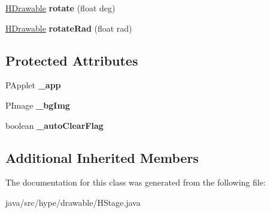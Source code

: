 \begin{DoxyCompactItemize}
\item 
\hypertarget{classhype_1_1drawable_1_1_h_stage_a9f9b1b42692ba75442c3c77a02ae54bf}{\hyperlink{classhype_1_1drawable_1_1_h_drawable}{H\-Drawable} {\bfseries rotate} (float deg)}\label{classhype_1_1drawable_1_1_h_stage_a9f9b1b42692ba75442c3c77a02ae54bf}

\item 
\hypertarget{classhype_1_1drawable_1_1_h_stage_a376cc1a9c6d4700d9e8f2cf73dd34bb6}{\hyperlink{classhype_1_1drawable_1_1_h_drawable}{H\-Drawable} {\bfseries rotate\-Rad} (float rad)}\label{classhype_1_1drawable_1_1_h_stage_a376cc1a9c6d4700d9e8f2cf73dd34bb6}

\end{DoxyCompactItemize}
\subsection*{Protected Attributes}
\begin{DoxyCompactItemize}
\item 
\hypertarget{classhype_1_1drawable_1_1_h_stage_acc8f556b5932d9ec0517827624f0a78a}{P\-Applet {\bfseries \-\_\-app}}\label{classhype_1_1drawable_1_1_h_stage_acc8f556b5932d9ec0517827624f0a78a}

\item 
\hypertarget{classhype_1_1drawable_1_1_h_stage_a889be7b38d96ba3d74b714161a96146c}{P\-Image {\bfseries \-\_\-bg\-Img}}\label{classhype_1_1drawable_1_1_h_stage_a889be7b38d96ba3d74b714161a96146c}

\item 
\hypertarget{classhype_1_1drawable_1_1_h_stage_a897a86463a443c95adaa9adbaca8b449}{boolean {\bfseries \-\_\-auto\-Clear\-Flag}}\label{classhype_1_1drawable_1_1_h_stage_a897a86463a443c95adaa9adbaca8b449}

\end{DoxyCompactItemize}
\subsection*{Additional Inherited Members}


The documentation for this class was generated from the following file\-:\begin{DoxyCompactItemize}
\item 
java/src/hype/drawable/H\-Stage.\-java\end{DoxyCompactItemize}
